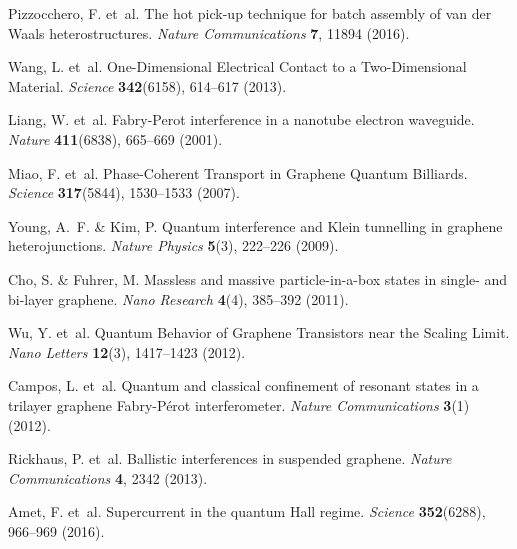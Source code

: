 \documentclass[preprint,
  onecolumn,
  notitlepage,
  amsmath,amssymb,
  aip,
  apl,
]{revtex4-1}
\begin{document}
\begin{thebibliography}{10}
	Pizzocchero, F. et~al.
	\newblock The hot pick-up technique for batch assembly of van der {{Waals}}
	heterostructures.
	\newblock \emph{Nature Communications} \textbf{7}, 11894 (2016).
	
	Wang, L. et~al.
	\newblock One-{{Dimensional Electrical Contact}} to a {{Two}}-{{Dimensional
			Material}}.
	\newblock \emph{Science} \textbf{342}(6158), 614--617 (2013).
	
	Liang, W. et~al.
	\newblock Fabry-{{Perot}} interference in a nanotube electron waveguide.
	\newblock \emph{Nature} \textbf{411}(6838), 665--669 (2001).
	
	Miao, F. et~al.
	\newblock Phase-{{Coherent Transport}} in {{Graphene Quantum Billiards}}.
	\newblock \emph{Science} \textbf{317}(5844), 1530--1533 (2007).
	
	Young, A.~F. \& Kim, P.
	\newblock Quantum interference and {{Klein}} tunnelling in graphene
	heterojunctions.
	\newblock \emph{Nature Physics} \textbf{5}(3), 222--226 (2009).
	
	Cho, S. \& Fuhrer, M.
	\newblock Massless and massive particle-in-a-box states in single- and bi-layer
	graphene.
	\newblock \emph{Nano Research} \textbf{4}(4), 385--392 (2011).
	
	Wu, Y. et~al.
	\newblock Quantum {{Behavior}} of {{Graphene Transistors}} near the {{Scaling
			Limit}}.
	\newblock \emph{Nano Letters} \textbf{12}(3), 1417--1423 (2012).
	
	Campos, L. et~al.
	\newblock Quantum and classical confinement of resonant states in a trilayer
	graphene {{Fabry}}-{{P{\'e}rot}} interferometer.
	\newblock \emph{Nature Communications} \textbf{3}(1) (2012).
	
	Rickhaus, P. et~al.
	\newblock Ballistic interferences in suspended graphene.
	\newblock \emph{Nature Communications} \textbf{4}, 2342 (2013).
	
	Amet, F. et~al.
	\newblock Supercurrent in the quantum {{Hall}} regime.
	\newblock \emph{Science} \textbf{352}(6288), 966--969 (2016).
	

\end{thebibliography}
\end{document}
